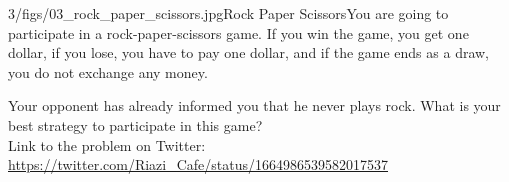 \begin{problem}{3/figs/03_rock_paper_scissors.jpg}{Rock Paper Scissors}You are going to participate in a rock-paper-scissors game. If you win the game, you get one dollar, if you lose, you have to pay one dollar, and if the game ends as a draw, you do not exchange any money.

Your opponent has already informed you that he never plays rock. What is your best strategy to participate in this game?\\[0.2cm]

Link to the problem on Twitter:  \url{https://twitter.com/Riazi_Cafe/status/1664986539582017537}\end{problem}